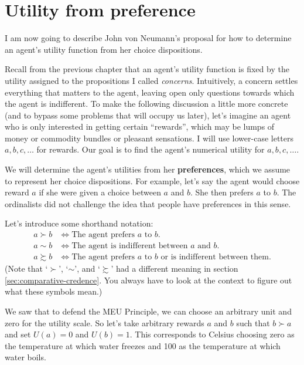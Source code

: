 \section{Utility from preference}

I am now going to describe John von Neumann's proposal for how to
determine an agent's utility function from her choice dispositions.

Recall from the previous chapter that an agent's utility function is
fixed by the utility assigned to the propositions I called
\emph{concerns}. Intuitively, a concern settles everything that
matters to the agent, leaving open only questions towards which the
agent is indifferent. To make the following discussion a little more
concrete (and to bypass some problems that will occupy us later),
let's imagine an agent who is only interested in getting certain
``rewards'', which may be lumps of money or commodity bundles or
pleasant sensations. I will use lower-case letters $a,b,c,\ldots$ for
rewards. Our goal is to find the agent's numerical utility for
$a,b,c,\ldots$.

We will determine the agent's utilities from her \textbf{preferences},
which we assume to represent her choice dispositions. For example,
let's say the agent would choose reward $a$ if she were given a choice
between $a$ and $b$. She then prefers $a$ to $b$. The ordinalists did
not challenge the idea that people have preferences in this sense.

Let's introduce some shorthand notation:
%
\begin{align*}
  a \succ b &\Leftrightarrow \text{The agent prefers $a$ to $b$}.\\
  a \sim b &\Leftrightarrow \text{The agent is indifferent between $a$ and $b$.}\\
  a \succsim b & \Leftrightarrow \text{The agent prefers $a$ to $b$ or is indifferent between them.}
\end{align*}
%
(Note that `$\succ$', `$\sim$', and `$\succsim$' had a different
meaning in section \ref{sec:comparative-credence}. You always have to
look at the context to figure out what these symbols mean.)

We saw that to defend the MEU Principle, we can choose an arbitrary
unit and zero for the utility scale. So let's take arbitrary rewards
$a$ and $b$ such that $b \succ a$ and set $U(a) = 0$ and $U(b) = 1$.
This corresponds to Celsius choosing zero as the temperature at which
water freezes and 100 as the temperature at which water boils.

